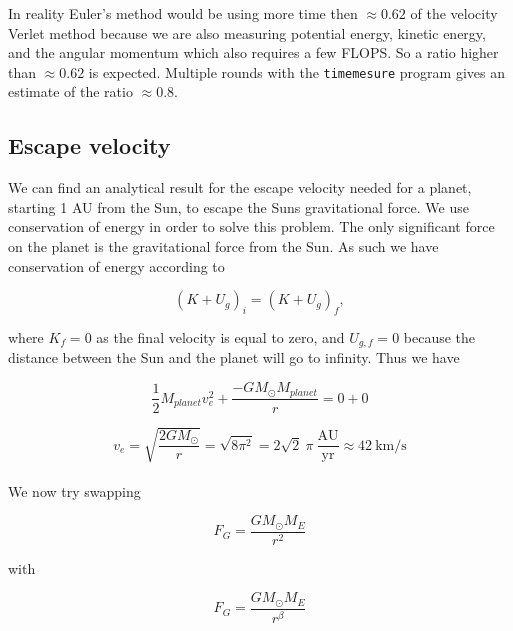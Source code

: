 \documentclass[a4paper, fontsize=11pt]{article}
\begin{document}
In reality Euler's method would be using more time then $\approx 0.62$ of the velocity Verlet method because we are also measuring potential energy, kinetic energy, and the angular momentum which also requires a few FLOPS. So a ratio higher than $\approx 0.62$ is expected. Multiple rounds with the \verb+timemesure+ program gives an estimate of the ratio $\approx 0.8$.


\subsection{Escape velocity}

We can find an analytical result for the escape velocity needed for a planet, starting 1 AU from the Sun, to escape the Suns gravitational force. We use conservation of energy in order to solve this problem. The only significant force on the planet is the gravitational force from the Sun. As such we have conservation of energy according to

\begin{equation}
(K + U_{g})_{i}=(K+U_{g})_{f},
\end{equation}

where $K_{f}=0$ as the final velocity is equal to zero, and $U_{g,f} = 0$ because the distance between the Sun and the planet will go to infinity. Thus we have

\begin{equation}
\dfrac{1}{2} M_{planet} v_{e}^2 + \dfrac{- G M_{\odot} M_{planet}}{r} = 0 + 0
\end{equation}

\begin{equation}
v_{e} = \sqrt{\dfrac{2 G M_{\odot}}{r}} = \sqrt{8 \pi^2}=2 \sqrt{2} \: \pi \: \frac{\text{AU}}{\text{yr}} \approx 42 \:  \text{km}/\text{s}
\end{equation}

\paragraph{}

We now try swapping

\begin{equation}
F_{G} = \dfrac{G M_{\odot} M_{E}}{r^2}
\end{equation}

with

\begin{equation}
F_{G} = \dfrac{G M_{\odot} M_{E}}{r^\beta}
\end{equation}
\end{document}

